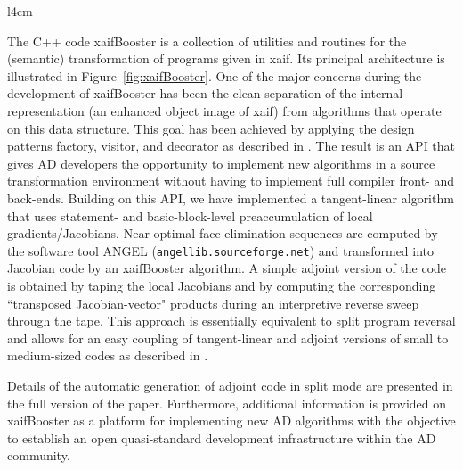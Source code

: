 \documentclass{article}
\newcommand{\fig}[1]{Figure~#1}
\begin{document}
\begin{wrapfigure}{l}{4cm}
\caption{xaifBooster parses xaif code into an internal representation (IR).
It provides an API for transformation algorithms to modify the IR. An unparser
returns the transformed xaif code.} \label{fig:xaifBooster}
\end{wrapfigure}
The C++ code xaifBooster is a collection of utilities and routines for the
(semantic) transformation of programs given in xaif. Its principal architecture 
is illustrated in \fig{\ref{fig:xaifBooster}}. One of the major concerns during
the development of xaifBooster has been the clean separation of the internal
representation (an enhanced object image of xaif) from algorithms that operate 
on this data structure. This goal has been achieved by applying the design 
patterns \cite{DesignPatterns} factory, visitor, and decorator as described in \cite{UtNa03}.
The result is an API that gives AD developers the opportunity
to implement new algorithms in a source transformation environment without
having to implement full compiler front- and back-ends. Building on
this API, we have implemented a tangent-linear algorithm that uses statement-
\cite{SEUpreacc} and basic-block-level preaccumulation of local 
gradients/Jacobians. Near-optimal face elimination \cite{ElimTechMP} sequences 
are computed by the software tool 
ANGEL \cite{AGN03,SAGA} ({\tt angellib.sourceforge.net}) and transformed into 
Jacobian code by
an xaifBooster algorithm. A simple adjoint version of the code is obtained
by taping the local Jacobians 
and by computing the corresponding ``transposed Jacobian-vector" products 
during an interpretive reverse sweep through the tape. This approach is
essentially equivalent to split program reversal \cite{Gri00} and allows
for an easy coupling of tangent-linear and adjoint versions of small to 
medium-sized codes as described in \cite{NaHe03}. 

Details of the automatic generation of adjoint code in split mode are presented
in the full version of the paper. Furthermore, additional information is 
provided on xaifBooster as a platform for implementing new AD algorithms with 
the objective to establish an open quasi-standard development infrastructure
within the AD community.
\end{document}

